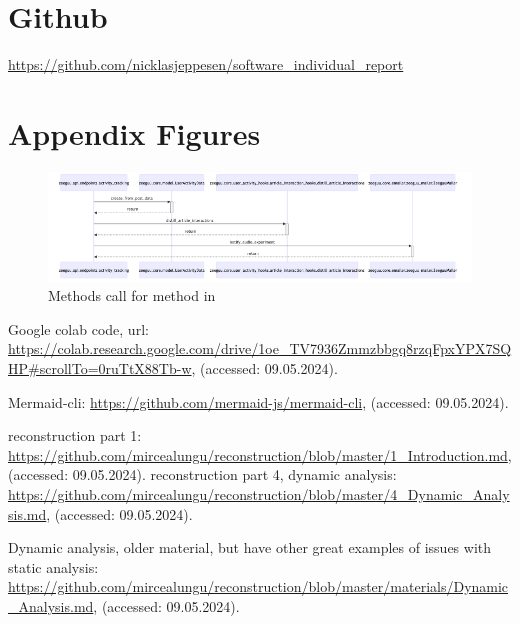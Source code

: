 \documentclass[12pt,a4paper]{report}
\begin{document}
    \chapter{Github}

    \url{https://github.com/nicklasjeppesen/software_individual_report}
    
    \appendix
    \chapter{Appendix Figures}

    \begin{figure}[H]
        \centering
        \includegraphics[scale=0.45]{upload_user_activity_data.png}
        \caption{Methods call for method  in  }
        \label{upload_user_activity}
    \end{figure}
   





    \begin{thebibliography}{9}
        
        Google colab code, url: \url{https://colab.research.google.com/drive/1oe_TV7936Zmmzbbgq8rzqFpxYPX7SQHP#scrollTo=0ruTtX88Tb-w}, (accessed: 09.05.2024).
        
        Mermaid-cli: \url{https://github.com/mermaid-js/mermaid-cli}, (accessed: 09.05.2024).
       
        reconstruction part 1: \url{https://github.com/mircealungu/reconstruction/blob/master/1_Introduction.md}, (accessed: 09.05.2024).
        reconstruction part 4, dynamic analysis: \url{https://github.com/mircealungu/reconstruction/blob/master/4_Dynamic_Analysis.md}, (accessed: 09.05.2024).
       
        Dynamic analysis, older material, but have other great examples of issues with static analysis: \url{https://github.com/mircealungu/reconstruction/blob/master/materials/Dynamic_Analysis.md}, (accessed: 09.05.2024).
       
    
    \end{thebibliography}
    

   
    
  
\end{document}

